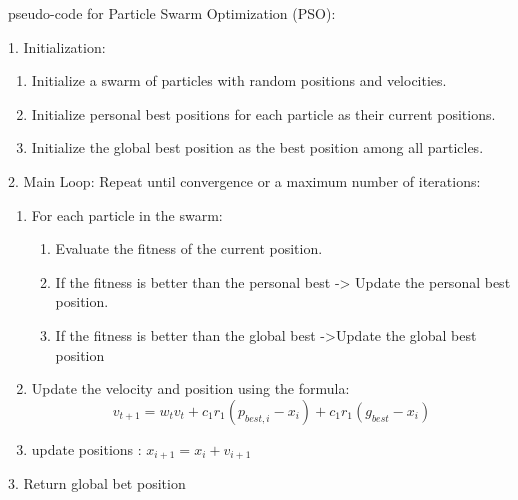 \documentclass[letterpaper, 12pt]{article}
\begin{document}
pseudo-code for Particle Swarm Optimization (PSO):

1. Initialization:

\begin{enumerate}
    \item Initialize a swarm of particles with random positions and velocities.
    \item Initialize personal best positions for each particle as their current positions.
    \item Initialize the global best position as the best position among all particles.
\end{enumerate}
2. Main Loop: Repeat until convergence or a maximum number of iterations:

\begin{enumerate}
    \item For each particle in the swarm:
    \begin{enumerate}
    \item Evaluate the fitness of the current position.
    \item If the fitness is better than the personal best -> Update the personal best position.
    \item If the fitness is better than the global best ->Update the global best position
    \end{enumerate}
    \item Update the velocity and position using the formula:  
\[v_{t+1}=w_tv_t+c_1r_1(p_{best,i}−x_i)+c_1r_1(g_{best}−x_i)\]
    \item update positions :  $x_{i+1}=x_i+v_{i+1}$
\end{enumerate}
3. Return global bet position
\end{document}
